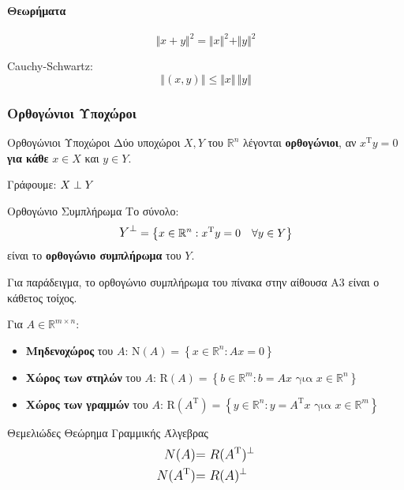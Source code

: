 \documentclass[11pt,a4paper,notitlepage,fleqn,draft]{article}
\begin{document}
	\paragraph{Θεωρήματα}
	\[
	\Vert x+y\Vert ^2 = \Vert x\Vert ^2 + \Vert y\Vert ^2
	\]
	
	Cauchy-Schwartz:
	\[
	\left\Vert(x,y)\right\Vert \leq \Vert x\Vert \,\Vert y\Vert 
	\]
	
	\subsubsection{Ορθογώνιοι Υποχώροι}
	\begin{defn}{Ορθογώνιοι Υποχώροι}{}
		Δύο υποχώροι \( X,Y \) του  \( \mathbb R^n \) λέγονται
		\textbf{ορθογώνιοι}, αν \( x^{\mathrm T}y = 0 \) \textbf{για
		κάθε} \( x \in X \) και \( y \in Y \).
	
	    Γράφουμε: \( \mathlarger{X \perp Y} \)
	\end{defn}
	\begin{defn}{Ορθογώνιο Συμπλήρωμα}{}
		Το σύνολο:
		\[
		\mathlarger{
			Y^\perp
			} = \left\lbrace 
			x \in \mathbb R^n : x^{\mathrm T}y = 0 \quad
			\forall y \in Y
			 \right\rbrace
		\]
		είναι το \textbf{ορθογώνιο συμπλήρωμα} του \( Y \).
		
		Για παράδειγμα, το ορθογώνιο συμπλήρωμα του πίνακα στην αίθουσα
		Α3 είναι ο κάθετος τοίχος.
	\end{defn}
	\begin{defn}{}{}
		Για \( A \in \mathbb R^{m \times n} \):
		\begin{itemize}
			\item \textbf{Μηδενοχώρος} του \( A \):
			\( \mathrm N(A) = \left\lbrace x\in\mathbb R^n: Ax=0
			 \right\rbrace \)
			\item \textbf{Χώρος των στηλών} του \( A \):
			\( \mathrm R(A)  = \left\lbrace
			b \in \mathbb R^m: b = Ax \text{ για }
			x \in \mathbb R^n \right\rbrace
			\)
			\item \textbf{Χώρος των γραμμών} του \( A \):
			\( \mathrm R(A^{\mathrm T}) = \left\lbrace 
			y \in \mathbb R^n: y = A^{\mathrm T}x \text{ για }
			x \in \mathbb R^m
			 \right\rbrace \)
		\end{itemize}
	\end{defn}
	\begin{theorem}{Θεμελιώδες Θεώρημα Γραμμικής Άλγεβρας}{}
		\begin{align*}
			\mathlarger{N(A)} &\mathlarger{= R(A^{\mathrm T})^\perp}
			\\
			\mathlarger{N(A^{\mathrm T})} &\mathlarger{= R(A)^\perp}
		\end{align*}
	\end{theorem}
\end{document}
